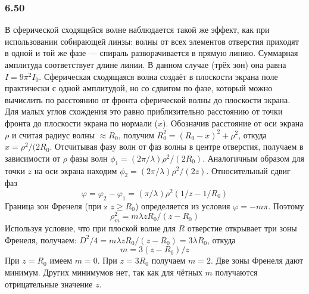 \subsubsection*{6.50}
В сферической сходящейся волне наблюдается такой же эффект, как при использовании собирающей линзы: волны от всех элементов отверстия приходят в одной и той же фазе --- спираль разворачивается в прямую линию. Суммарная амплитуда соответствует длине линии. В данном случае (трёх зон) она равна $I=9 \pi^2 I_0$. Сферическая сходящаяся волна создаёт в плоскости экрана поле практически с одной амплитудой, но со сдвигом по фазе, который можно вычислить по расстоянию от фронта сферической волны до плоскости экрана. Для малых углов схождения это равно приблизительно расстоянию от точки фронта до плоскости экрана по нормали ($x$). Обозначив расстояние от оси экрана $\rho$ и считая радиус волны $\approx R_0$, получим $R_0^2 = (R_0 - x)^2 + \rho^2$, откуда $x = \rho^2/(2R_0$. Отсчитывая фазу волн от фаз волны в центре отверстия, получаем в зависимости от $\rho$ фазы волн $\phi_1 = (2\pi / \lambda)\rho^2/(2R_0)$. Аналогичным образом для точки $z$ на оси экрана находим $\phi_2 =  (2\pi / \lambda)\rho^2/(2z)$. Относительный сдвиг фаз 
\begin{equation*}
	\varphi = \varphi_2 - \varphi_1 = (\pi / \lambda) \rho^2 (1/z - 1/R_0)
\end{equation*}
Граница зон Френеля (при z $z \geq R_0$) определяется из условия $\varphi = -m\pi$. Поэтому 
\begin{equation*}
	\rho^2_m = m \lambda z R_0 / (z - R_0)
\end{equation*}
Используя условие, что при плоской волне для $R$ отверстие открывает три зоны Френеля, получаем: $D^2/4 = m \lambda z R_0 / (z - R_0) = 3 \lambda R_0$, откуда
\begin{equation*}
	m = 3(z - R_0) / z
\end{equation*}
При $z = R_0$ имеем $m = 0$. При $z  = 3R_0$ получаем $m = 2$. Две зоны Френеля дают минимум. Других минимумов нет, так как для чётных $m$ получаются отрицательные значение $z$.
